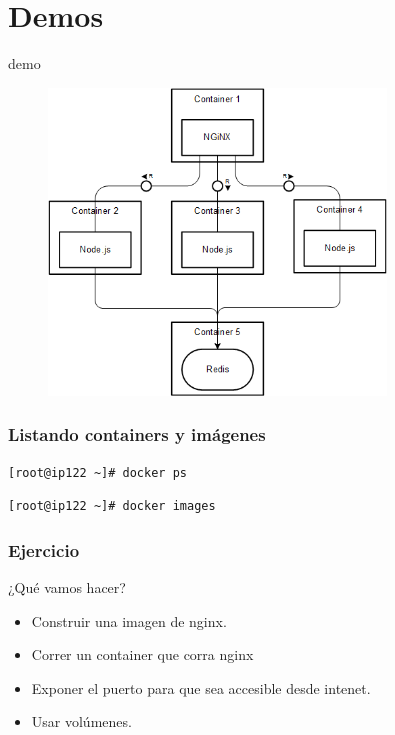 \documentclass[compress]{beamer}
\begin{document}
\section{Demos}
\begin{frame}{demo}
\begin{figure}[H]
  \centering
  \includegraphics[width=0.8\textwidth]{images/DockerSample.png}
    \label{fig:dynamic}
\end{figure}	
\end{frame}



\begin{frame}[fragile]
\frametitle{Listando containers y imágenes}
\begin{lstlisting}
[root@ip122 ~]# docker ps
\end{lstlisting}

\begin{lstlisting}
[root@ip122 ~]# docker images
\end{lstlisting}
\end{frame}

\begin{frame}[fragile]
\frametitle{Ejercicio}
¿Qué vamos hacer?
\begin{itemize}
	\item Construir una imagen de nginx.
	\item Correr un container que corra nginx
	\item Exponer el puerto para que sea accesible desde intenet.
	\item Usar volúmenes.
\end{itemize}
\end{frame}
\end{document}
